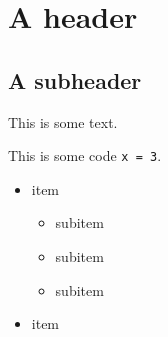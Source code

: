 \documentclass[a4paper]{article}
\begin{document}
    \tableofcontents
    \clearpage
    
    \section{A header}

    \subsection{A subheader}

    This is some text.

    This is some code \texttt{x = 3}.

    \begin{itemize}
        \item item
        \begin{itemize}
            \item subitem
            \item subitem
            \item subitem
        \end{itemize}
        \item item
    \end{itemize}


    \clearpage
    
    
    \clearpage
    \printglossaries
\end{document}
